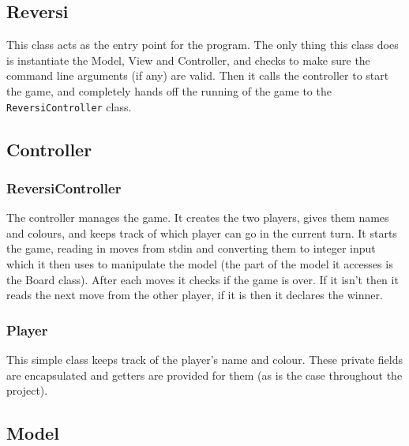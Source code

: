\documentclass[11pt,a4paper,oneside]{article}
\begin{document}
\begin{figure}
\end{figure}

\subsection*{Reversi}
This class acts as the entry point for the program. The only thing this class does is instantiate the Model, View and Controller, and checks to make sure the command line arguments (if any) are valid. Then it calls the controller to start the game, and completely hands off the running of the game to the \texttt{ReversiController} class.

\subsection*{Controller}
\subsubsection*{ReversiController}
The controller manages the game. It creates the two players, gives them names and colours, and keeps track of which player can go in the current turn. It starts the game, reading in moves from stdin and converting them to integer input which it then uses to manipulate the model (the part of the model it accesses is the Board class). After each moves it checks if the game is over. If it isn't then it reads the next move from the other player, if it is then it declares the winner.

\subsubsection*{Player}
This simple class keeps track of the player's name and colour. These private fields are encapsulated and getters are provided for them (as is the case throughout the project).

\subsection*{Model}
\end{document}
